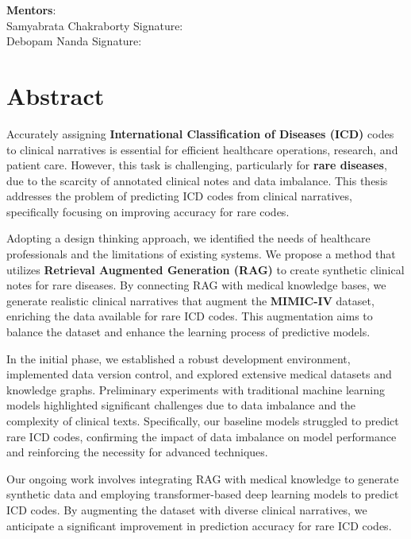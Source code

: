 \documentclass[12pt,a4paper]{report}
\begin{document}
\vspace{1in}

\noindent \textbf{Mentors}: \\
Samyabrata Chakraborty \hfill Signature: \\
Debopam Nanda \hfill Signature: \\

\vfill
\newpage

\chapter*{Abstract}
Accurately assigning \textbf{International Classification of Diseases (ICD)} codes to clinical narratives is essential for efficient healthcare operations, research, and patient care. However, this task is challenging, particularly for \textbf{rare diseases}, due to the scarcity of annotated clinical notes and data imbalance. This thesis addresses the problem of predicting ICD codes from clinical narratives, specifically focusing on improving accuracy for rare codes.

Adopting a design thinking approach, we identified the needs of healthcare professionals and the limitations of existing systems. We propose a method that utilizes \textbf{Retrieval Augmented Generation (RAG)} to create synthetic clinical notes for rare diseases. By connecting RAG with medical knowledge bases, we generate realistic clinical narratives that augment the \textbf{MIMIC-IV} dataset, enriching the data available for rare ICD codes. This augmentation aims to balance the dataset and enhance the learning process of predictive models.

In the initial phase, we established a robust development environment, implemented data version control, and explored extensive medical datasets and knowledge graphs. Preliminary experiments with traditional machine learning models highlighted significant challenges due to data imbalance and the complexity of clinical texts. Specifically, our baseline models struggled to predict rare ICD codes, confirming the impact of data imbalance on model performance and reinforcing the necessity for advanced techniques.

Our ongoing work involves integrating RAG with medical knowledge to generate synthetic data and employing transformer-based deep learning models to predict ICD codes. By augmenting the dataset with diverse clinical narratives, we anticipate a significant improvement in prediction accuracy for rare ICD codes.
\end{document}
